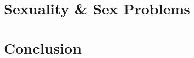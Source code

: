 \documentclass{article}
\numberwithin{equation}{section}
\begin{document}

\section{Sexuality \& Sex Problems}


\section{Conclusion}


\printbibliography[heading=bibintoc]
	
\end{document}
